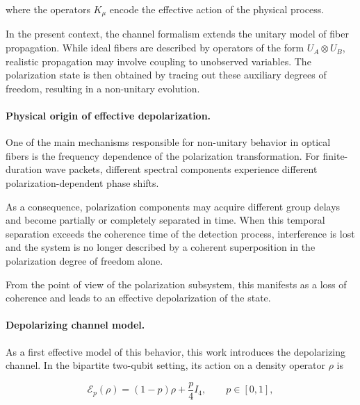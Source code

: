 where the operators \( K_{\mu} \) encode the effective action of the physical process.

\medskip

In the present context, the channel formalism extends the unitary model of fiber propagation. While ideal fibers are described by operators of the form \( U_A \otimes U_B \), realistic propagation may involve coupling to unobserved variables. The polarization state is then obtained by tracing out these auxiliary degrees of freedom, resulting in a non-unitary evolution.

\medskip

\paragraph{Physical origin of effective depolarization.}

One of the main mechanisms responsible for non-unitary behavior in optical fibers is the frequency dependence of the polarization transformation. For finite-duration wave packets, different spectral components experience different polarization-dependent phase shifts.

As a consequence, polarization components may acquire different group delays and become partially or completely separated in time. When this temporal separation exceeds the coherence time of the detection process, interference is lost and the system is no longer described by a coherent superposition in the polarization degree of freedom alone.

\medskip

From the point of view of the polarization subsystem, this manifests as a loss of coherence and leads to an effective depolarization of the state.

\medskip

\paragraph{Depolarizing channel model.}

As a first effective model of this behavior, this work introduces the depolarizing channel. In the bipartite two-qubit setting, its action on a density operator \( \rho \) is

\begin{equation}
\mathcal{E}_p(\rho)
=
(1-p)\rho
+
\frac{p}{4}I_4,
\qquad
p \in [0,1],
\label{eq:global_two_qubit_depolarizing_channel}
\end{equation}

